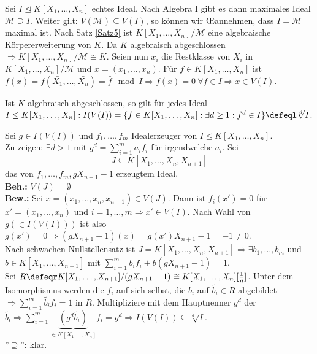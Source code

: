 \begin{Bew}
  Sei $I \trianglelefteq K[X_1, \dots, X_n]$ echtes Ideal. Nach Algebra I gibt es dann maximales Ideal $\mathcal{M} \supseteq I$. Weiter gilt: $V(\mathcal{M}) \subseteq V(I)$, so können wir \OE annehmen, dass $I = \mathcal{M}$ maximal ist.
  Nach Satz \ref{Satz5} ist $K[X_1, \dots, X_n]/\mathcal{M}$ eine algebraische Körpererweiterung von $K$.
  Da $K$ algebraisch abgeschlossen $\Rightarrow K[X_1, \dots, X_n]/\mathcal{M} \cong K$.
  Seien nun $x_i$ die Restklasse von $X_i$ in $K[X_1, \dots, X_n]/\mathcal{M}$ und $x = (x_1, \dots, x_n)$.
  Für $f \in K[X_1, \dots, X_n]$ ist $f(x) = f(\bar{X_1}, \dots, \bar{X_n}) = \bar{f} \mod I \Rightarrow f(x) = 0\ \forall f \in I \Rightarrow x \in V(I)$.
\end{Bew}

\begin{nnSatz}
  Ist $K$ algebraisch abgeschlossen, so gilt für jedes Ideal $I \trianglelefteq K[X_1, \dots, X_n]: I(V(I)) = \{ f \in K[X_1, \dots, X_n]: \exists d \ge 1: f^d \in I \} \defeql \sqrt[d]{I}$.
\end{nnSatz}

\begin{Bew}
  Sei $g \in I(V(I))$ und $f_1, \dots, f_m$ Idealerzeuger von $I \trianglelefteq K[X_1, \dots, X_n]$.\\
  Zu zeigen: $\exists d > 1 \text{ mit } g^d = \sum_{i = 1}^m a_i f_i$ für irgendwelche $a_i$.
  Sei 
  \[
  J \subseteq K[X_1, \dots, X_n, X_{n+1}]
  \]
  das von $f_1, \dots, f_m, gX_{n+1}-1$ erzeugtem Ideal.\\
  \textbf{Beh.:} $V(J) = \emptyset$\\
  \textbf{Bew.:} Sei $x = (x_1, \dots, x_n, x_{n+1}) \in V(J)$.
  Dann ist $f_i(x') = 0$ für $x' = (x_1, \dots, x_n)$ und $i = 1, \dots, m \Rightarrow x' \in V(I)$.
  Nach Wahl von $g (\in I(V(I)))$ ist also $g(x') = 0 \Rightarrow (gX_{n+1}-1)(x) = g(x') X_{n+1} - 1 = -1 \not= 0$.\\
  Nach schwachen Nullstellensatz ist $J = K[X_1, \dots, X_n,X_{n+1}] \Rightarrow \exists b_1,
  \dots, b_m$ und $b \in K[X_1, \dots, X_{n+1}]$ mit $\sum_{i=1}^m b_i f_i + b(gX_{n+1} - 1) = 1$.\\
  Sei $R \defeqr K[X_1, \dots, X_{n+1}]/ (gX_{n+1} - 1) \cong K[X_1, \dots, X_n][\frac{1}{g}]$. Unter dem Isomorphismus werden die $f_i$ auf sich selbst, die $b_i$ auf $\tilde{b_i} \in R$ abgebildet $\Rightarrow \sum_{i = 1}^m \tilde{b_i} f_i = 1 \text{ in } R$.
  Multipliziere mit dem Hauptnenner $g^d$ der $\tilde{b_i} \Rightarrow \sum_{i = 1}^m \underset{\in K[X_1, \dots, X_n]}{\underbrace{(g^d \tilde{b_i})}} f_i = g^d \Rightarrow I(V(I)) \subseteq \sqrt[d]{I}$.\\
  ''$\supseteq$'': klar.
\end{Bew}
